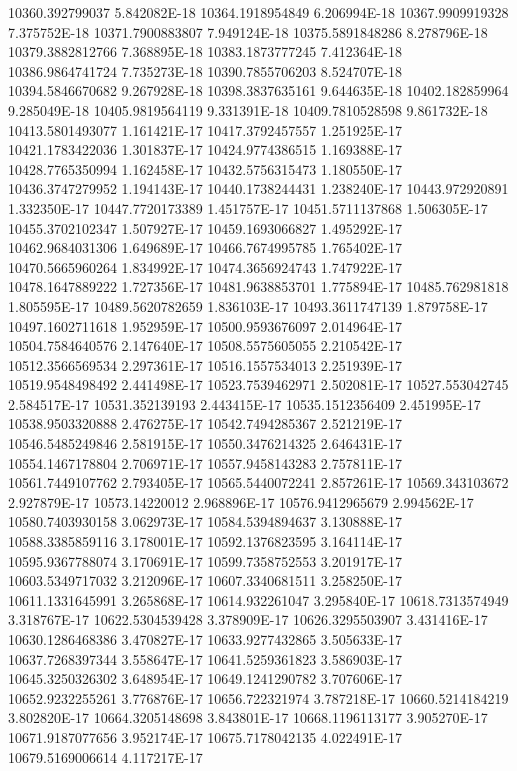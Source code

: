 10360.392799037  5.842082E-18
10364.1918954849  6.206994E-18
10367.9909919328  7.375752E-18
10371.7900883807  7.949124E-18
10375.5891848286  8.278796E-18
10379.3882812766  7.368895E-18
10383.1873777245  7.412364E-18
10386.9864741724  7.735273E-18
10390.7855706203  8.524707E-18
10394.5846670682  9.267928E-18
10398.3837635161  9.644635E-18
10402.182859964  9.285049E-18
10405.9819564119  9.331391E-18
10409.7810528598  9.861732E-18
10413.5801493077  1.161421E-17
10417.3792457557  1.251925E-17
10421.1783422036  1.301837E-17
10424.9774386515  1.169388E-17
10428.7765350994  1.162458E-17
10432.5756315473  1.180550E-17
10436.3747279952  1.194143E-17
10440.1738244431  1.238240E-17
10443.972920891  1.332350E-17
10447.7720173389  1.451757E-17
10451.5711137868  1.506305E-17
10455.3702102347  1.507927E-17
10459.1693066827  1.495292E-17
10462.9684031306  1.649689E-17
10466.7674995785  1.765402E-17
10470.5665960264  1.834992E-17
10474.3656924743  1.747922E-17
10478.1647889222  1.727356E-17
10481.9638853701  1.775894E-17
10485.762981818  1.805595E-17
10489.5620782659  1.836103E-17
10493.3611747139  1.879758E-17
10497.1602711618  1.952959E-17
10500.9593676097  2.014964E-17
10504.7584640576  2.147640E-17
10508.5575605055  2.210542E-17
10512.3566569534  2.297361E-17
10516.1557534013  2.251939E-17
10519.9548498492  2.441498E-17
10523.7539462971  2.502081E-17
10527.553042745  2.584517E-17
10531.352139193  2.443415E-17
10535.1512356409  2.451995E-17
10538.9503320888  2.476275E-17
10542.7494285367  2.521219E-17
10546.5485249846  2.581915E-17
10550.3476214325  2.646431E-17
10554.1467178804  2.706971E-17
10557.9458143283  2.757811E-17
10561.7449107762  2.793405E-17
10565.5440072241  2.857261E-17
10569.343103672  2.927879E-17
10573.14220012  2.968896E-17
10576.9412965679  2.994562E-17
10580.7403930158  3.062973E-17
10584.5394894637  3.130888E-17
10588.3385859116  3.178001E-17
10592.1376823595  3.164114E-17
10595.9367788074  3.170691E-17
10599.7358752553  3.201917E-17
10603.5349717032  3.212096E-17
10607.3340681511  3.258250E-17
10611.1331645991  3.265868E-17
10614.932261047  3.295840E-17
10618.7313574949  3.318767E-17
10622.5304539428  3.378909E-17
10626.3295503907  3.431416E-17
10630.1286468386  3.470827E-17
10633.9277432865  3.505633E-17
10637.7268397344  3.558647E-17
10641.5259361823  3.586903E-17
10645.3250326302  3.648954E-17
10649.1241290782  3.707606E-17
10652.9232255261  3.776876E-17
10656.722321974  3.787218E-17
10660.5214184219  3.802820E-17
10664.3205148698  3.843801E-17
10668.1196113177  3.905270E-17
10671.9187077656  3.952174E-17
10675.7178042135  4.022491E-17
10679.5169006614  4.117217E-17

